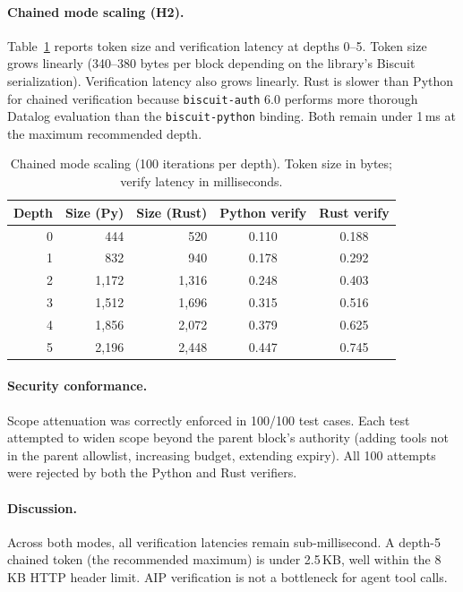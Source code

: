 \documentclass[11pt,a4paper]{article}
\newcommand{\aip}{\textsc{AIP}}
\begin{document}
\paragraph{Chained mode scaling (H2).} Table~\ref{tab:chained} reports token size and verification latency at depths 0--5. Token size grows linearly (340--380 bytes per block depending on the library's Biscuit serialization). Verification latency also grows linearly. Rust is slower than Python for chained verification because \texttt{biscuit-auth} 6.0 performs more thorough Datalog evaluation than the \texttt{biscuit-python} binding. Both remain under 1\,ms at the maximum recommended depth.

\begin{table}[t]
\centering
\caption{Chained mode scaling (100 iterations per depth). Token size in bytes; verify latency in milliseconds.}
\label{tab:chained}
\footnotesize
\begin{tabular}{@{}rrrcc@{}}
\toprule
\textbf{Depth} & \textbf{Size (Py)} & \textbf{Size (Rust)} & \textbf{Python verify} & \textbf{Rust verify} \\
\midrule
0 &  444 &  520 & 0.110 & 0.188 \\
1 &  832 &  940 & 0.178 & 0.292 \\
2 & 1,172 & 1,316 & 0.248 & 0.403 \\
3 & 1,512 & 1,696 & 0.315 & 0.516 \\
4 & 1,856 & 2,072 & 0.379 & 0.625 \\
5 & 2,196 & 2,448 & 0.447 & 0.745 \\
\bottomrule
\end{tabular}
\end{table}

\paragraph{Security conformance.} Scope attenuation was correctly enforced in 100/100 test cases. Each test attempted to widen scope beyond the parent block's authority (adding tools not in the parent allowlist, increasing budget, extending expiry). All 100 attempts were rejected by both the Python and Rust verifiers.

\paragraph{Discussion.} Across both modes, all verification latencies remain sub-millisecond. A depth-5 chained token (the recommended maximum) is under 2.5\,KB, well within the 8\,KB HTTP header limit. \aip{} verification is not a bottleneck for agent tool calls.
\end{document}
